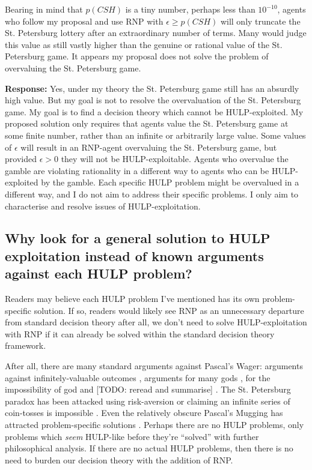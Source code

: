 \documentclass{article}
\begin{document}
Bearing in mind that \(p(CSH)\) is a tiny number, perhaps less than \(10^{-10}\), agents who follow my proposal and use RNP with \(\epsilon \geq p(CSH)\) will only truncate the St. Petersburg lottery after an extraordinary number of terms. Many would judge this value as still vastly higher than the genuine or rational value of the St. Petersburg game. It appears my proposal does not solve the problem of overvaluing the St. Petersburg game. 

\textbf{Response:} Yes, under my theory the St. Petersburg game still has an absurdly high value. But my goal is not to resolve the overvaluation of the St. Petersburg game. My goal is to find a decision theory which cannot be HULP-exploited. My proposed solution only requires that agents value the St. Petersburg game at some finite number, rather than an infinite or arbitrarily large value. Some values of \(\epsilon\) will result in an RNP-agent overvaluing the St. Petersburg game, but provided \(\epsilon>0\) they will not be HULP-exploitable. Agents who overvalue the gamble are violating rationality in a different way to agents who can be HULP-exploited by the gamble. Each specific HULP problem might be overvalued in a different way, and I do not aim to address their specific problems. I only aim to characterise and resolve issues of HULP-exploitation.

\subsection{Why look for a general solution to HULP exploitation instead of known arguments against each HULP problem?} 

Readers may believe each HULP problem I've mentioned has its own problem-specific solution. If so, readers would likely see RNP as an unnecessary departure from standard decision theory \textemdash{} after all, we don't need to solve HULP-exploitation with RNP if it can already be solved within the standard decision theory framework.

After all, there are many standard arguments against Pascal's Wager: arguments against infinitely-valuable outcomes \citep{mcclennen1994pascal}, arguments for many gods \citep{saka2001pascal}, for the impossibility of god \citep{oppy1991rescher} and [TODO: reread and summarise] \citep{hajek2003waging}. The St. Petersburg paradox has been attacked using risk-aversion \citep{weirich1984st} or claiming an infinite series of coin-tosses is impossible \citep[pg. 154]{jeffrey1990logic}. Even the relatively obscure Pascal's Mugging has attracted problem-specific solutions \citep{baumann2009counting}. Perhaps there are no HULP problems, only problems which \textit{seem} HULP-like before they're ``solved'' with further philosophical analysis. If there are no actual HULP problems, then there is no need to burden our decision theory with the addition of RNP.
\end{document}
